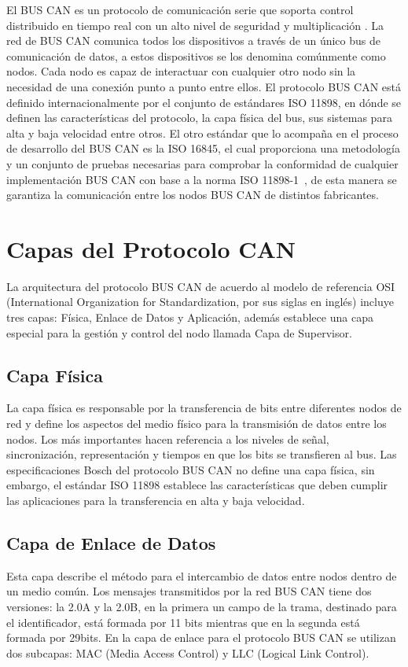 El BUS CAN es un protocolo de comunicación serie que soporta control distribuido en tiempo real con un alto nivel de seguridad y multiplicación  \cite{PSMR}. 
La red de BUS CAN comunica todos los dispositivos a través de un único bus de comunicación de datos, a estos dispositivos se los denomina comúnmente como nodos. 
Cada nodo es capaz de interactuar con cualquier otro nodo sin la necesidad de una conexión punto a punto entre ellos.
El protocolo BUS CAN está definido internacionalmente por el conjunto de estándares ISO 11898, en dónde se definen las características del protocolo, la capa física del bus, sus sistemas para alta y baja velocidad entre otros. 
El otro estándar que lo acompaña en el proceso de desarrollo del BUS CAN es la ISO 16845, el cual proporciona una  metodología y un conjunto de pruebas necesarias para comprobar la conformidad de cualquier implementación BUS CAN con base a la norma ISO 11898-1~\cite{ISO}, de esta manera se garantiza la comunicación entre los nodos BUS CAN de distintos fabricantes.

\section {Capas del Protocolo CAN}

La arquitectura del protocolo BUS CAN de acuerdo al modelo de referencia OSI (International Organization for Standardization, por sus siglas en inglés) incluye tres capas: Física, Enlace de Datos y Aplicación, además establece una capa especial para la gestión y control del nodo llamada Capa de Supervisor. 




\subsection{Capa Física}
La capa física es responsable por la transferencia de bits entre diferentes nodos de red y define los aspectos del medio físico para la transmisión de datos entre los nodos. 
Los más importantes hacen referencia a los niveles de señal, sincronización, representación y tiempos en que los bits se transfieren al bus. 
Las especificaciones Bosch del protocolo BUS CAN no define una capa física, sin embargo, el estándar  ISO 11898 establece las características que deben cumplir las aplicaciones para la transferencia en alta y baja velocidad.
 
\subsection {Capa de Enlace de Datos}
Esta capa describe el método para el intercambio de datos entre nodos dentro de un medio común.
Los mensajes transmitidos por la red BUS CAN tiene dos versiones: la 2.0A y la 2.0B, en la primera un campo de la trama, destinado para el identificador,  está formada por 11 bits mientras que en la segunda está formada por 29bits.
En la capa de enlace para el protocolo BUS CAN se utilizan dos subcapas: MAC (Media Access Control) y LLC (Logical Link Control).

